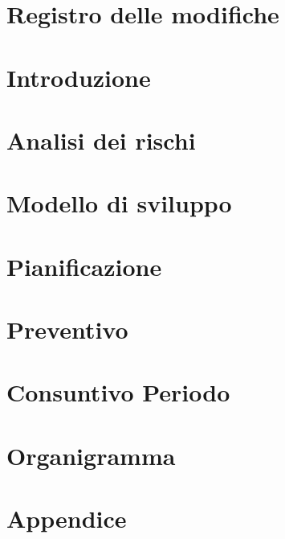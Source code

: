 \documentclass[a4paper, oneside, openany, dvipsnames, table]{article}
\begin{document}
    \copertina{}
    
    \section*{Registro delle modifiche}\label{sec:Registro-modifiche}
    
    
    \newpage
    \tableofcontents
    
    \newpage
    \listoftables
    
    \newpage
    \listoffigures
    
    \newpage
    \section{Introduzione}\label{sec:Introduzione}
    

    \section{Analisi dei rischi}\label{sec:Analisi-rischi}
    

    \section{Modello di sviluppo}\label{sec:Modello-sviluppo}
    
    \newpage
    \section{Pianificazione}\label{sec:Pianificazione}
    

    \section{Preventivo}\label{sec:Preventivo}
    

    \newpage
    \section{Consuntivo Periodo}\label{sec:Consuntivo-periodo}
    
    \newpage
    \section{Organigramma}\label{sec:Organigramma}
    
    \setcounter{secnumdepth}{0}
    \section{Appendice}\label{sec:Appendice}
    \appendix
    
\end{document}
